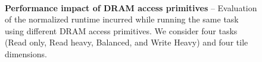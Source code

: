 \documentclass[letterpaper]{article}
\begin{document}
\begin{figure}[ht!]
    \centering
    \\
    \caption{\textbf{Performance impact of DRAM access primitives} -- Evaluation
    of the normalized runtime incurred while running the same task using
    different DRAM access primitives. We consider four tasks (Read only, Read heavy,
    Balanced, and Write Heavy) and four tile dimensions.}

    \label{fig:evaluation}
\end{figure}
\end{document}

